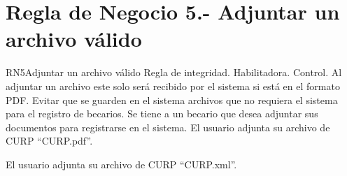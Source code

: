 
\section{Regla de Negocio 5.- Adjuntar un archivo válido}

\begin{BussinesRule}{RN5}{Adjuntar un archivo válido}
	\BRitem[Tipo:] Regla de integridad. 
	\BRitem[Clase:] Habilitadora. 
	\BRitem[Nivel:] Control. %
	\BRitem[Descripción:] Al adjuntar un archivo este solo será recibido por el sistema si está en el formato PDF.
	\BRitem[Motivación:] Evitar que se guarden en el sistema archivos que no requiera el sistema para el registro de becarios.
	\BRitem[Sentencia:] 
	   Se tiene a un becario que desea adjuntar sus documentos para registrarse en el sistema.
	 El usuario adjunta su archivo de CURP ``CURP.pdf''.
	
	 El usuario adjunta su archivo de CURP ``CURP.xml''. 
\end{BussinesRule}